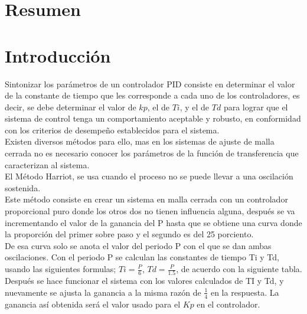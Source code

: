 \documentclass[]{article}
\begin{document}
	


\tableofcontents  %


\section{Resumen}

\section{Introducción}

Sintonizar los parámetros de un controlador PID consiste en determinar el valor de la
constante de tiempo que les corresponde a cada uno de los controladores, es decir, se
debe determinar el valor de $kp$, el de $Ti$, y el de $Td$ para lograr que el sistema de control tenga un comportamiento aceptable y robusto, en conformidad con los criterios de
desempeño establecidos para el sistema.\\

Existen diversos métodos para ello, mas en los sistemas de ajuste de malla cerrada no
es necesario conocer los parámetros de la función de transferencia que caracterizan al
sistema.\\

El Método Harriot, se usa cuando el proceso no se puede llevar a una oscilación
sostenida.\\

Este método consiste en crear un sistema en malla cerrada con un controlador
proporcional puro donde los otros dos no tienen influencia alguna, después se va
incrementando el valor de la ganancia del P hasta que se obtiene una curva donde la
proporción del primer sobre paso y el segundo es del 25 porciento.\\

 De esa curva solo se
anota el valor del periodo P con el que se dan ambas oscilaciones. Con el periodo P se
calculan las constantes de tiempo Ti y Td, usando las siguientes formulas; $Ti = \frac{P}{6}$,
$Td=\frac{P}{1.5}$, de acuerdo con la siguiente tabla. Después se hace funcionar el sistema con
los valores calculados de TI y Td, y nuevamente se ajusta la ganancia a la misma razón
de $\frac{1}{4}$ en la respuesta. La ganancia así obtenida será el valor usado para el $Kp$ en el
controlador.\\
\end{document}
